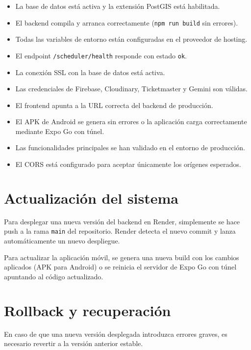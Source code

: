 \begin{itemize}
    \item[$\square$] La base de datos está activa y la extensión PostGIS está habilitada.
    \item[$\square$] El backend compila y arranca correctamente (\texttt{npm run build} sin errores).
    \item[$\square$] Todas las variables de entorno están configuradas en el proveedor de hosting.
    \item[$\square$] El endpoint \texttt{/scheduler/health} responde con estado \texttt{ok}.
    \item[$\square$] La conexión SSL con la base de datos está activa.
    \item[$\square$] Las credenciales de Firebase, Cloudinary, Ticketmaster y Gemini son válidas.
    \item[$\square$] El frontend apunta a la URL correcta del backend de producción.
    \item[$\square$] El APK de Android se genera sin errores o la aplicación carga correctamente mediante Expo Go con túnel.
    \item[$\square$] Las funcionalidades principales se han validado en el entorno de producción.
    \item[$\square$] El CORS está configurado para aceptar únicamente los orígenes esperados.
\end{itemize}

\section{Actualización del sistema}

Para desplegar una nueva versión del backend en Render, simplemente se hace push a la rama \texttt{main} del repositorio. Render detecta el nuevo commit y lanza automáticamente un nuevo despliegue.

Para actualizar la aplicación móvil, se genera una nueva build con los cambios aplicados (APK para Android) o se reinicia el servidor de Expo Go con túnel apuntando al código actualizado.

\section{Rollback y recuperación}

En caso de que una nueva versión desplegada introduzca errores graves, es necesario revertir a la versión anterior estable.

